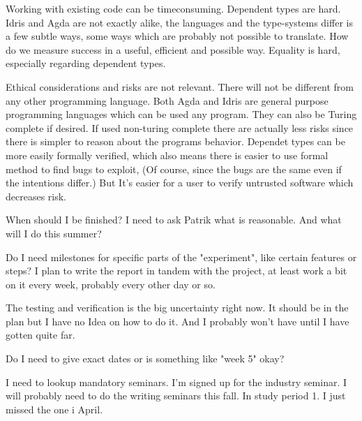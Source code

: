 \documentclass{scrartcl}
\begin{document}

%
Working with existing code can be timeconsuming.
Dependent types are hard.
Idris and Agda are not exactly alike, the languages and the type-systems differ
is a few subtle ways, some ways which are probably not possible to translate.
How do we measure success in a useful, efficient and possible way. Equality is
hard, especially regarding dependent types.

Ethical considerations and risks are not relevant. There will not be different
from any other programming language. Both Agda and Idris are general purpose
programming languages which can be used any program. They can also be Turing
complete if desired. If used non-turing complete there are actually less risks
since there is simpler to reason about the programs behavior. Dependet types
can be more easily formally verified, which also means there is easier to use
formal method to find bugs to exploit, (Of course, since the bugs are the same
even if the intentions differ.) But It's easier for a user to verify untrusted
software which decreases risk.


When should I be finished? I need to ask Patrik what is reasonable. And what
will I do this summer?

Do I need milestones for specific parts of the "experiment", like certain
features or steps? I plan to write the report in tandem with the project, at
least work a bit on it every week, probably every other day or so.

The testing and verification is the big uncertainty right now. It should be in
the plan but I have no Idea on how to do it. And I probably won't have until
I have gotten quite far.

Do I need to give exact dates or is something like "week 5" okay?

I need to lookup mandatory seminars.
I'm signed up for the industry seminar.
I will probably need to do the writing seminars this fall. In study period 1.
I just missed the one i April.
\end{document}
